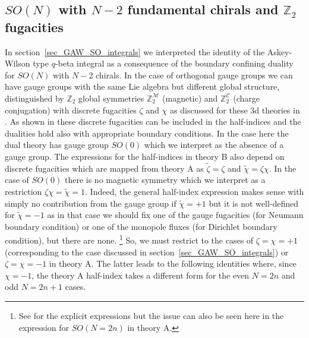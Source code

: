 \documentclass[12pt]{article}
\newcommand{\Zb}{\mathbb{Z}}
\newcommand{\Ccal}{\mathcal{C}}
\newcommand{\Mcal}{\mathcal{M}}
\numberwithin{equation}{section}
\begin{document}
\subsection{$SO(N)$ with $N-2$ fundamental chirals and $\Zb_2$ fugacities}
\label{sec_SON_Nm2_discrete_integrals}
In section~\ref{sec_GAW_SO_integrals} we interpreted the identity of the Askey-Wilson type $q$-beta integral as a consequence of the boundary confining duality
for $SO(N)$ with $N-2$ chirals. 
In the case of orthogonal gauge groups we can have gauge groups with the same Lie algebra but different global structure, distinguished by $\Zb_2$ global symmetries $\Zb_2^{\Mcal}$ (magnetic) and $\Zb_2^{\Ccal}$ (charge conjugation) with discrete fugacities $\zeta$ and $\chi$ as discussed for these 3d theories in \cite{Aharony:2013kma}. As shown in \cite{Okazaki:2021pnc} these discrete fugacities can be included in the half-indices and the dualities hold also with appropriate boundary conditions. In the case here the dual theory has gauge group $SO(0)$ which we interpret as the absence of a gauge group. The expressions for the half-indices in theory B also depend on discrete fugacities which are mapped from theory A as $\tilde{\zeta} = \zeta$ and $\tilde{\chi} = \zeta \chi$. In the case of $SO(0)$ there is no magnetic symmetry which we interpret as a restriction $\zeta \chi = \tilde{\chi} = 1$. Indeed, the general half-index expression makes sense with simply no contribution from the gauge group if $\tilde{\chi} = +1$ but it is not well-defined for $\tilde{\chi} = -1$ as in that case we should fix one of the gauge fugacities (for Neumann boundary condition) or one of the monopole fluxes (for Dirichlet boundary condition), but there are none. \footnote{See \cite{Okazaki:2021pnc} for the explicit expressions but the issue can also be seen here in the expression for $SO(N = 2n)$ in theory A.} So, we must restrict to the cases of $\zeta = \chi = +1$ (corresponding to the case discussed in section~\ref{sec_GAW_SO_integrals}) or $\zeta = \chi = -1$ in theory A. The latter leads to the following identities where, since $\chi = -1$, the theory A half-index takes a different form for the even $N = 2n$ and odd $N = 2n+1$ cases.
\end{document}
